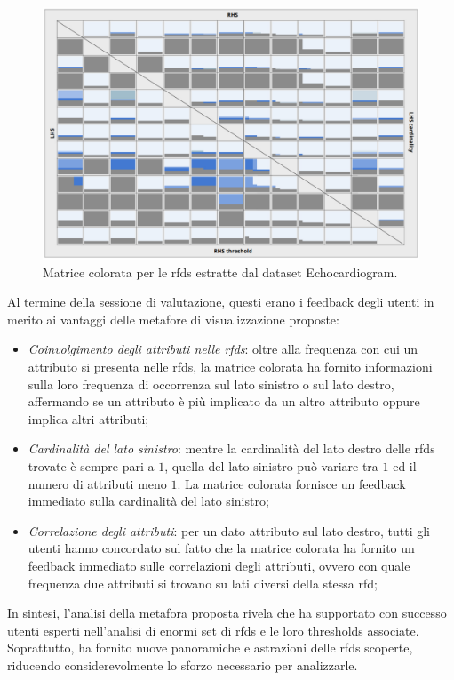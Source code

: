 \begin{figure}[ht]
    \centering
    \includegraphics[width=\linewidth]{capitoli/figure/echo_metaphore}
    \caption{Matrice colorata per le \acrshort{rfds} estratte dal dataset Echocardiogram.}
    \label{fig:colored_matrix_echo}
\end{figure}
Al termine della sessione di valutazione, questi erano i feedback degli utenti in merito ai vantaggi delle metafore di visualizzazione proposte:
\begin{itemize}
    \item \textit{Coinvolgimento degli attributi nelle \acrshort{rfds}}: oltre alla frequenza con cui un attributo si presenta nelle \acrshort{rfds}, la matrice colorata ha fornito informazioni sulla loro frequenza di occorrenza sul lato sinistro o sul lato destro, affermando se un attributo \`{e} pi\`{u} implicato da un altro attributo oppure implica altri attributi;
    \item \textit{Cardinalit\`{a} del lato sinistro}: mentre la cardinalit\`{a} del lato destro delle \acrshort{rfds} trovate \`{e} sempre pari a $1$, quella del lato sinistro pu\`{o} variare tra $1$ ed il numero di attributi meno $1$. La matrice colorata fornisce un feedback immediato sulla cardinalit\`{a} del lato sinistro;
    \item \textit{Correlazione degli attributi}: per un dato attributo sul lato destro, tutti gli utenti hanno concordato sul fatto che la matrice colorata ha fornito un feedback immediato sulle correlazioni degli attributi, ovvero con quale frequenza due attributi si trovano su lati diversi della stessa \acrshort{rfd};
\end{itemize}
In sintesi, l'analisi della metafora proposta rivela che ha supportato con successo utenti esperti nell'analisi di enormi set di \acrshort{rfds} e le loro thresholds associate. Soprattutto, ha fornito nuove panoramiche e astrazioni delle \acrshort{rfds} scoperte, riducendo considerevolmente lo sforzo necessario per analizzarle.

